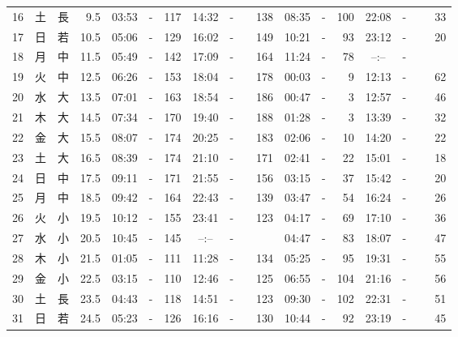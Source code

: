 \documentclass[12pt,a4j]{jsarticle}
\begin{document}
\begin{table}[htbp]
\begin{center}
\begin{tabular}{|rc|cr|ccrccr|ccrccr|}
16 & 土 & 長 &  9.5 &  03:53 &-& 117  &  14:32 &-& 138  &   08:35 &-& 100  &   22:08 &-&  33  \\
17 & 日 & 若 & 10.5 &  05:06 &-& 129  &  16:02 &-& 149  &   10:21 &-&  93  &   23:12 &-&  20  \\
18 & 月 & 中 & 11.5 &  05:49 &-& 142  &  17:09 &-& 164  &   11:24 &-&  78  &   --:-- &-&~~~~~ \\
19 & 火 & 中 & 12.5 &  06:26 &-& 153  &  18:04 &-& 178  &   00:03 &-&   9  &   12:13 &-&  62  \\
20 & 水 & 大 & 13.5 &  07:01 &-& 163  &  18:54 &-& 186  &   00:47 &-&   3  &   12:57 &-&  46  \\
21 & 木 & 大 & 14.5 &  07:34 &-& 170  &  19:40 &-& 188  &   01:28 &-&   3  &   13:39 &-&  32  \\
22 & 金 & 大 & 15.5 &  08:07 &-& 174  &  20:25 &-& 183  &   02:06 &-&  10  &   14:20 &-&  22  \\
23 & 土 & 大 & 16.5 &  08:39 &-& 174  &  21:10 &-& 171  &   02:41 &-&  22  &   15:01 &-&  18  \\
24 & 日 & 中 & 17.5 &  09:11 &-& 171  &  21:55 &-& 156  &   03:15 &-&  37  &   15:42 &-&  20  \\
25 & 月 & 中 & 18.5 &  09:42 &-& 164  &  22:43 &-& 139  &   03:47 &-&  54  &   16:24 &-&  26  \\
26 & 火 & 小 & 19.5 &  10:12 &-& 155  &  23:41 &-& 123  &   04:17 &-&  69  &   17:10 &-&  36  \\
27 & 水 & 小 & 20.5 &  10:45 &-& 145  &  --:-- &-&~~~~~ &   04:47 &-&  83  &   18:07 &-&  47  \\
28 & 木 & 小 & 21.5 &  01:05 &-& 111  &  11:28 &-& 134  &   05:25 &-&  95  &   19:31 &-&  55  \\
29 & 金 & 小 & 22.5 &  03:15 &-& 110  &  12:46 &-& 125  &   06:55 &-& 104  &   21:16 &-&  56  \\
30 & 土 & 長 & 23.5 &  04:43 &-& 118  &  14:51 &-& 123  &   09:30 &-& 102  &   22:31 &-&  51  \\
31 & 日 & 若 & 24.5 &  05:23 &-& 126  &  16:16 &-& 130  &   10:44 &-&  92  &   23:19 &-&  45  \\
   \hline
   \end{tabular}
   \end{center}
\end{table}
\newpage
\end{document}

